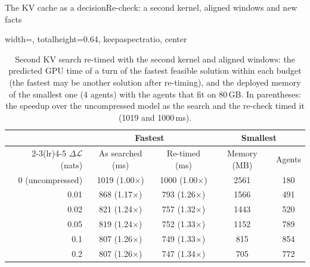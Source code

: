 \documentclass[aspectratio=169,10pt]{beamer}
\newcommand{\dloss}{\Delta\mathcal{L}}
\begin{document}
\begin{frame}{The KV cache as a decision}{Re-check: a second kernel, aligned windows and new facts}
\begin{table}
\centering
\begin{adjustbox}{width=\linewidth, totalheight=0.64\textheight, keepaspectratio, center}
\centering
\small
\begin{tabular}{rcccc}
\toprule
& \multicolumn{2}{c}{Fastest} & \multicolumn{2}{c}{Smallest} \\
\cmidrule(lr){2-3}\cmidrule(lr){4-5}
$\dloss$ (nats) & As searched (ms) & Re-timed (ms) & Memory (MB) & Agents \\
\midrule
0 (uncompressed) & 1019 (1.00$\times$) & 1000 (1.00$\times$) & 2561 & 180 \\
\midrule
0.01 & 868 (1.17$\times$) & 793 (1.26$\times$) & 1566 & 491 \\
0.02 & 821 (1.24$\times$) & 757 (1.32$\times$) & 1443 & 520 \\
0.05 & 819 (1.24$\times$) & 752 (1.33$\times$) & 1152 & 789 \\
0.1  & 807 (1.26$\times$) & 749 (1.33$\times$) &  815 & 854 \\
0.2  & 807 (1.26$\times$) & 747 (1.34$\times$) &  705 & 772 \\
\bottomrule
\end{tabular}
\end{adjustbox}
\caption{Second KV search re-timed with the second kernel and aligned windows: the predicted GPU time of a
turn of the fastest feasible solution within each budget (the fastest may be another solution after
re-timing), and the deployed memory of the smallest one (4 agents) with the agents that fit on 80\,GB.
In parentheses: the speedup over the uncompressed model as the search and the re-check timed it (1019 and
1000\,ms).}\label{tab:kv-retimed}
\end{table}
\end{frame}
\end{document}

